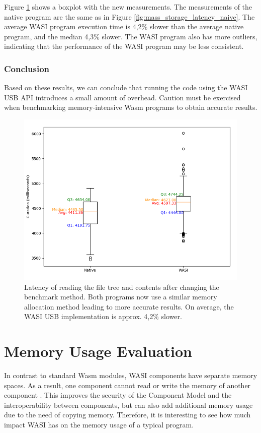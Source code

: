 Figure \ref{fig:mass_storage_latency_optimized} shows a boxplot with the new measurements. The measurements of the native program are the same as in Figure \ref{fig:mass_storage_latency_naive}. The average \acrshort{WASI} program execution time is 4,2\% slower than the average native program, and the median 4,3\% slower. The \acrshort{WASI} program also has more outliers, indicating that the performance of the \acrshort{WASI} program may be less consistent.

\subsubsection{Conclusion}
Based on these results, we can conclude that running the code using the \acrshort{WASI} \acrshort{USB} \acrshort{API} introduces a small amount of overhead. Caution must be exercised when benchmarking memory-intensive \acrshort{Wasm} programs to obtain accurate results.

\begin{figure}[H]
  \centering
  \includegraphics[width=1\textwidth]{images/mass_storage_1000_runs_optimized.png}
  \caption{Latency of reading the file tree and contents after changing the benchmark method. Both programs now use a similar memory allocation method leading to more accurate results. On average, the \acrshort{WASI} \acrshort{USB} implementation is approx. 4,2\% slower.}
  \label{fig:mass_storage_latency_optimized}
\end{figure}

\section{Memory Usage Evaluation}
In contrast to standard \acrshort{Wasm} modules, \acrshort{WASI} components have separate memory spaces. As a result, one component cannot read or write the memory of another component \cite{memory_model}. This improves the security of the Component Model and the interoperability between components, but can also add additional memory usage due to the need of copying memory. Therefore, it is interesting to see how much impact \acrshort{WASI} has on the memory usage of a typical program.

